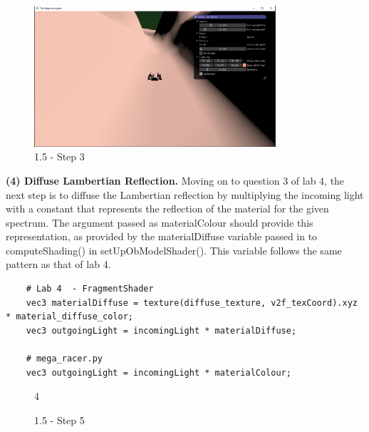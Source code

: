 \documentclass[a4 paper, 12pt]{article}
\begin{document}
    \begin{figure} [H]
        \centering
        \includegraphics[width=0.8\textwidth, frame]
            {./images/1.5_c.PNG}
        \caption{1.5 - Step 3}
    \end{figure}


\textbf{(4) Diffuse Lambertian Reflection.}
Moving on to question 3 of lab 4, the next step is to diffuse the Lambertian reflection by multiplying the incoming light with a constant that represents the reflection of the material for the given spectrum. The argument passed as materialColour should provide this representation, as provided by the materialDiffuse variable passed in to computeShading() in setUpObModelShader(). This variable follows the same pattern as that of lab 4.  
    \begin{lstlisting}
    # Lab 4  - FragmentShader
    vec3 materialDiffuse = texture(diffuse_texture, v2f_texCoord).xyz * material_diffuse_color;
    vec3 outgoingLight = incomingLight * materialDiffuse;

    # mega_racer.py
    vec3 outgoingLight = incomingLight * materialColour;                      
    \end{lstlisting}

    \begin{figure} [H]
        \caption{1.5 - Step 5}   4
    \end{figure}
\end{document}
